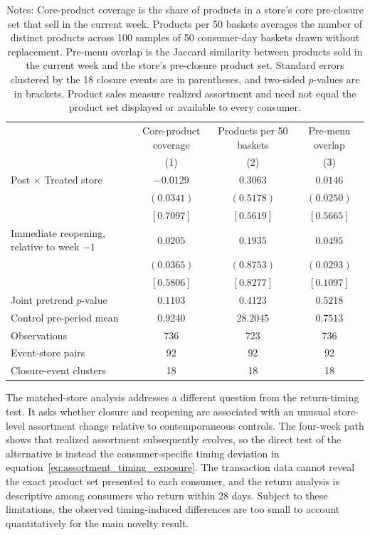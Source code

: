 \documentclass[11 pt]{article}
\newcommand\fnote[1]{\captionsetup{font=footnotesize}\caption*{#1}}
\begin{document}
\begin{table}[!ht]
\centering
\caption{Realized assortment at reopening stores and matched controls}
\label{tab:appendix_reopening_assortment}
\small
\begin{tabularx}{\textwidth}{Xccc}
\toprule
& Core-product coverage & Products per 50 baskets & Pre-menu overlap \\
& (1) & (2) & (3) \\
\midrule
Post $\times$ Treated store & $-0.0129$ & $0.3063$ & $0.0146$ \\
& $(0.0341)$ & $(0.5178)$ & $(0.0250)$ \\
& $[0.7097]$ & $[0.5619]$ & $[0.5665]$ \\
\addlinespace
Immediate reopening, relative to week $-1$ & $0.0205$ & $0.1935$ & $0.0495$ \\
& $(0.0365)$ & $(0.8753)$ & $(0.0293)$ \\
& $[0.5806]$ & $[0.8277]$ & $[0.1097]$ \\
Joint pretrend $p$-value & $0.1103$ & $0.4123$ & $0.5218$ \\
Control pre-period mean & $0.9240$ & $28.2045$ & $0.7513$ \\
Observations & 736 & 723 & 736 \\
Event-store pairs & 92 & 92 & 92 \\
Closure-event clusters & 18 & 18 & 18 \\
\bottomrule
\end{tabularx}
\vspace{1mm}
\fnote{Notes: Core-product coverage is the share of products in a store's core pre-closure set that sell in the current week. Products per 50 baskets averages the number of distinct products across 100 samples of 50 consumer-day baskets drawn without replacement. Pre-menu overlap is the Jaccard similarity between products sold in the current week and the store's pre-closure product set. Standard errors clustered by the 18 closure events are in parentheses, and two-sided $p$-values are in brackets. Product sales measure realized assortment and need not equal the product set displayed or available to every consumer.}
\end{table}

The matched-store analysis addresses a different question from the return-timing test. It asks whether closure and reopening are associated with an unusual store-level assortment change relative to contemporaneous controls. The four-week path shows that realized assortment subsequently evolves, so the direct test of the alternative is instead the consumer-specific timing deviation in equation~\eqref{eq:assortment_timing_exposure}. The transaction data cannot reveal the exact product set presented to each consumer, and the return analysis is descriptive among consumers who return within 28 days. Subject to these limitations, the observed timing-induced differences are too small to account quantitatively for the main novelty result.
\end{document}
